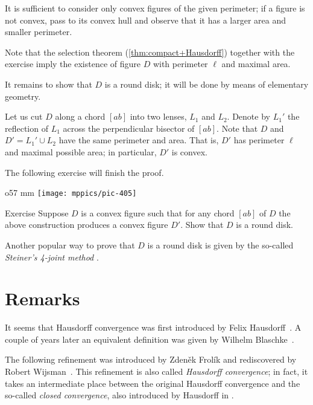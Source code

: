 It is sufficient to consider only convex figures of the given perimeter; if a figure is not convex, pass to its convex hull and observe that it has a larger area and smaller perimeter.


Note that the selection theorem (\ref{thm:compact+Hausdorff}) together with the exercise imply the existence of figure $D$ with perimeter $\ell$ and maximal area.

It remains to show that $D$ is a round disk;
it will be done by means of elementary geometry.

Let us cut $D$ along a chord $[ab]$ into two lenses, $L_1$ and $L_2$.
Denote by $L_1'$ the reflection of $L_1$ across the perpendicular bisector of $[ab]$.
Note that $D$ and $D'=L_1'\cup L_2$ have the same perimeter and area.
That is, $D'$ has perimeter $\ell$ and maximal possible area;
in particular, $D'$ is convex.

The following exercise will finish the proof.
\qeds

{

\begin{wrapfigure}{o}{57 mm}
\vskip-5mm
\centering
\texttt{[image: mppics/pic-405]}
\end{wrapfigure}

\begin{thm}{Exercise}\label{ex:round-disc}
Suppose $D$ is a convex figure such that for any chord $[ab]$ of $D$ the above construction produces a convex figure $D'$.
Show that $D$ is a round disk.
\end{thm}

}

Another popular way to prove that $D$ is a round disk is given by the so-called \textit{Steiner's 4-joint method} \cite{blaschke}.

\section{Remarks}\label{sec:H-variation}

It seems that Hausdorff convergence was first introduced by Felix Hausdorff~\cite{hausdorff}.
A couple of years later an equivalent definition was given by Wilhelm Blaschke~\cite{blaschke}.

The following refinement was introduced by  Zdeněk Frolík \cite{frolik} and rediscovered by Robert Wijsman~\cite{wijsman}.  
This refinement is also called \emph{Hausdorff convergence};
in fact, it takes an intermediate place between the original Hausdorff convergence and the so-called \textit{closed convergence}, also introduced by Hausdorff in \cite{hausdorff}.

